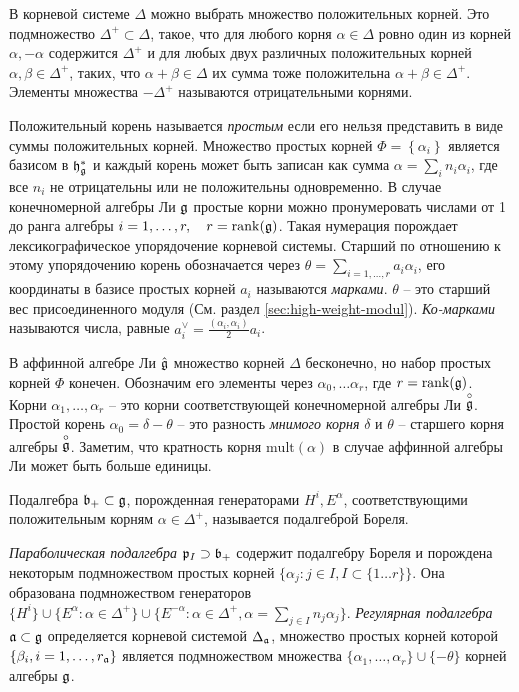 В корневой системе $\Delta$ можно выбрать множество положительных корней. Это подмножество  $\Delta^{+}\subset \Delta$, такое, что для любого корня $\alpha\in\Delta$ ровно один из корней $\alpha, -\alpha$ содержится $\Delta^{+}$ и для любых двух различных положительных корней $\alpha, \beta\in \Delta^{+}$, таких, что $\alpha+\beta\in \Delta$ их сумма тоже положительна $\alpha+\beta\in\Delta^{+}$.
Элементы множества $-\Delta^{+}$ называются отрицательными корнями.

Положительный корень называется {\it простым} если его нельзя представить в виде суммы положительных корней. Множество простых корней  $\Phi=\left\{\alpha_{i}\right\}$ является базисом в $\mathfrak{h}_{\mathfrak{g}}^{*}$ и каждый корень может быть записан как сумма $\alpha=\sum_{i}n_{i}\alpha_{i}$, где все $n_{i}$ не отрицательны или не положительны одновременно. В случае конечномерной алгебры Ли  $\mathfrak{g}$ простые корни можно пронумеровать числами от  1 до ранга алгебры $i=1,\dots,r,\quad r=\mathrm{rank}(\mathfrak{g})$. Такая нумерация порождает лексикографическое упорядочение корневой системы. Старший по отношению к этому упорядочению корень обозначается через $\theta=\sum_{i=1,\dots,r} a_i \alpha_i$, его координаты в базисе простых корней $a_i$ называются  {\it марками}. $\theta$ -- это старший вес присоединенного модуля (См. раздел \ref{sec:high-weight-modul}). {\it Ко-марками} называются числа, равные $a_i^{\vee}=\frac{(\alpha_i,\alpha_i)}{2} a_i$.

В аффинной алгебре Ли  $\hat{\mathfrak{g}}$ множество корней  $\Delta$ бесконечно, но набор простых корней  $\Phi$ конечен. Обозначим его элементы через $\alpha_{0},\dots \alpha_{r}$, где $r=\mathrm{rank}(\mathfrak{g})$. Корни $\alpha_1,\dots, \alpha_r$ -- это корни соответствующей конечномерной алгебры Ли $\stackrel{\circ }{\mathfrak{g}}$. Простой корень  $\alpha_0=\delta-\theta$ -- это разность  {\it мнимого корня} $\delta$ и $\theta$ -- старшего корня алгебры $\stackrel{\circ }{\mathfrak{g}}$.
Заметим, что кратность корня  $\mathrm{mult}(\alpha)$ в случае аффинной алгебры Ли может быть больше единицы.

Подалгебра  $\mathfrak{b}_{+}\subset \mathfrak{g}$, порожденная генераторами $H^{i}, E^{\alpha}$, соответствующими положительным корням $\alpha\in \Delta^{+}$, называется подалгеброй Бореля.

{\it Параболическая подалгебра}  $\mathfrak{p}_{I}\supset \mathfrak{b}_{+}$ содержит подалгебру Бореля и порождена некоторым подмножеством простых корней  $\{\alpha_{j}:j\in I, I\subset \{1\dots r\}\}$. Она образована подмножеством генераторов  $\{H^{i}\}\cup \{E^{\alpha}:\alpha\in \Delta^{+}\}\cup \{E^{-\alpha}: \alpha\in\Delta^{+}, \alpha=\sum_{j\in I} n_{j} \alpha_{j}\}$.
{\it Регулярная подалгебра} $\mathfrak{a}\subset\mathfrak{g}$ определяется корневой системой  $\Delta_{\mathfrak{a}}$, множество простых корней которой  $\{\beta_{i}, i=1,\dots,r_{\mathfrak{a}}\}$ является подмножеством множества $\{\alpha_{1},\dots,\alpha_{r}\}\cup \{-\theta\}$ корней алгебры $\mathfrak{g}$.

